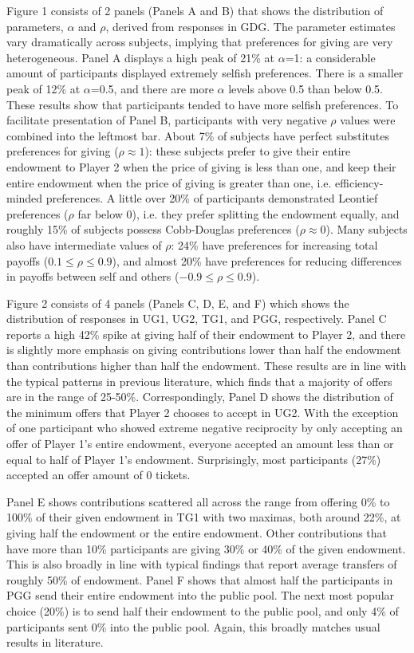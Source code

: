 \documentclass[12pt]{article}
\begin{document}
Figure 1 consists of 2 panels (Panels A and B) that shows the distribution of parameters, \(\alpha\) and \(\rho\), derived from responses in GDG.  The parameter estimates vary dramatically across subjects, implying that preferences for giving are very heterogeneous. Panel A displays a high peak of 21\% at \(\alpha\)=1: a considerable amount of participants displayed extremely selfish preferences. There is a smaller peak of 12\% at \(\alpha\)=0.5, and there are more \(\alpha\) levels above 0.5 than below 0.5. These results show that participants tended to have more selfish preferences. To facilitate presentation of Panel B, participants with very negative \(\rho\) values were combined into the leftmost bar. About 7\% of subjects have perfect substitutes preferences for giving (\(\rho \approx 1\)): these subjects prefer to give their entire endowment to Player 2 when the price of giving is less than one, and keep their entire endowment when the price of giving is greater than one, i.e. efficiency-minded preferences. A little over 20\% of participants demonstrated Leontief preferences (\(\rho\) far below 0), i.e. they prefer splitting the endowment equally, and roughly 15\% of subjects possess Cobb-Douglas preferences (\(\rho \approx 0\)). Many subjects also have intermediate values of \(\rho\): 24\% have preferences for increasing total payoffs (\(0.1 \leq \rho \leq 0.9\)), and almost 20\% have preferences for reducing differences in payoffs between self and others (\(-0.9 \leq \rho \leq 0.9\)).

Figure 2 consists of 4 panels (Panels C, D, E, and F) which shows the distribution of responses in UG1, UG2, TG1, and PGG, respectively. Panel C reports a high 42\% spike at giving half of their endowment to Player 2, and there is slightly more emphasis on giving contributions lower than half the endowment than contributions higher than half the endowment. These results are in line with the typical patterns in previous literature, which finds that a majority of offers are in the range of 25-50\%. Correspondingly, Panel D shows the distribution of the minimum offers that Player 2 chooses to accept in UG2. With the exception of one participant who showed extreme negative reciprocity by only accepting an offer of Player 1's entire endowment, everyone accepted an amount less than or equal to half of Player 1's endowment. Surprisingly, most participants (27\%) accepted an offer amount of 0 tickets. 

Panel E shows contributions scattered all across the range from offering 0\% to 100\% of their given endowment in TG1 with two maximas, both around 22\%, at giving half the endowment or the entire endowment. Other contributions that have more than 10\% participants are giving 30\% or 40\% of the given endowment. This is also broadly in line with typical findings that report average transfers of roughly 50\% of endowment. Panel F shows that almost half the participants in PGG send their entire endowment into the public pool. The next most popular choice (20\%) is to send half their endowment to the public pool, and only 4\% of participants sent 0\% into the public pool. Again, this broadly matches usual results in literature.
\end{document}
